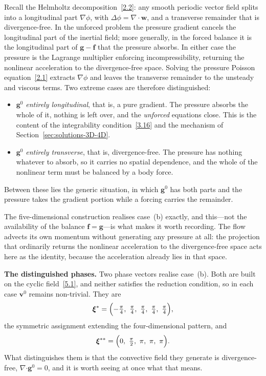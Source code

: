 \documentclass[11pt]{jfm}
\providecommand\bcdot{\boldsymbol{\cdot}}
\numberwithin{equation}{section}
\begin{document}
Recall the Helmholtz decomposition~\eqref{2.2}: any smooth periodic vector field splits into a
longitudinal part $\nabla\phi$, with $\Delta\phi=\nabla\cdot\boldsymbol{w}$, and a transverse
remainder that is divergence-free. In the unforced problem the pressure gradient cancels the longitudinal part of the inertial field;
more generally, in the forced balance it is the longitudinal part of
$\boldsymbol{g}-\boldsymbol{f}$ that the pressure absorbs. In either case the pressure is the
Lagrange multiplier enforcing incompressibility, returning the nonlinear acceleration to the divergence-free
space. Solving the pressure Poisson equation~\eqref{2.1} extracts $\nabla\phi$ and leaves the
transverse remainder to the unsteady and viscous terms. Two extreme cases are therefore
distinguished:
\begin{itemize}
\item[(a)] $\boldsymbol{g}^0$ \emph{entirely longitudinal}, that is, a pure gradient. The pressure
absorbs the whole of it, nothing is left over, and the \emph{unforced} equations close. This is
the content of the integrability condition~\eqref{3.16} and the mechanism of
Section~\ref{sec:solutions-3D-4D}.
\item[(b)] $\boldsymbol{g}^0$ \emph{entirely transverse}, that is, divergence-free. The pressure
has nothing whatever to absorb, so it carries no spatial dependence, and the whole of the
nonlinear term must be balanced by a body force.
\end{itemize}
Between these lies the generic situation, in which $\boldsymbol{g}^0$ has both parts and the
pressure takes the gradient portion while a forcing carries the remainder.

The five-dimensional construction realises case~(b) exactly, and this---not the availability of
the balance $\boldsymbol{f}=\boldsymbol{g}$---is what makes it worth recording. The flow advects
its own momentum without generating any pressure at all: the projection that ordinarily returns
the nonlinear acceleration to the divergence-free space acts here as the identity, because the
acceleration already lies in that space.

\medskip
\noindent\textbf{The distinguished phases.} Two phase vectors realise case~(b). Both are built
on the cyclic field~\eqref{5.1}, and neither satisfies the reduction condition, so in each case
$\boldsymbol{v}^0$ remains non-trivial. They are
\begin{equation}
\label{5.9}
\boldsymbol{\xi}^{\ast} = \Bigl(-\tfrac{\pi}{4},\ \tfrac{\pi}{4},\ \tfrac{\pi}{4},\
\tfrac{\pi}{4},\ \tfrac{\pi}{4}\Bigr),
\end{equation}
the symmetric assignment extending the four-dimensional pattern, and
\begin{equation}
\label{5.9b}
\boldsymbol{\xi}^{\ast\ast} = \Bigl(0,\ \tfrac{\pi}{2},\ \pi,\ \pi,\ \pi\Bigr).
\end{equation}
What distinguishes them is that the convective field they generate is divergence-free,
$\nabla\bcdot\boldsymbol{g}^0=0$, and it is worth seeing at once what that means.
\end{document}
